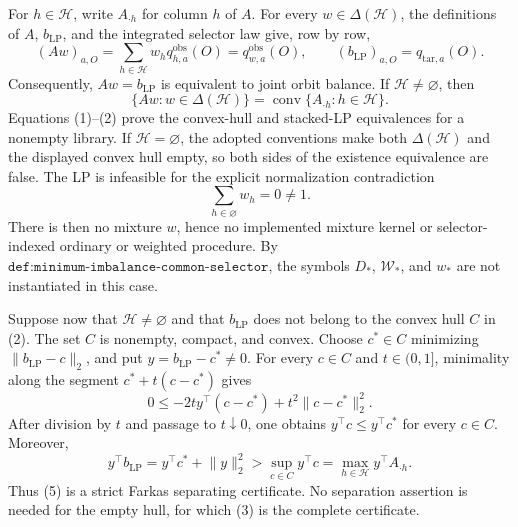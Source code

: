 For \(h\in\mathcal H\), write \(A_{\cdot h}\) for column \(h\) of \(A\). For every \(w\in\Delta(\mathcal H)\), the definitions of \(A\), \(b_{\mathrm{LP}}\), and the integrated selector law give, row by row,
\[
(Aw)_{a,O}=\sum_{h\in\mathcal H}w_hq^{\mathrm{obs}}_{h,a}(O)=q^{\mathrm{obs}}_{w,a}(O),
\qquad
(b_{\mathrm{LP}})_{a,O}=q_{\mathrm{tar},a}(O).
\tag{1}
\]
Consequently, \(Aw=b_{\mathrm{LP}}\) is equivalent to joint orbit balance. If \(\mathcal H\ne\varnothing\), then
\[
\{Aw:w\in\Delta(\mathcal H)\}=\operatorname{conv}\{A_{\cdot h}:h\in\mathcal H\}.
\tag{2}
\]
Equations (1)--(2) prove the convex-hull and stacked-LP equivalences for a nonempty library. If \(\mathcal H=\varnothing\), the adopted conventions make both \(\Delta(\mathcal H)\) and the displayed convex hull empty, so both sides of the existence equivalence are false. The LP is infeasible for the explicit normalization contradiction
\[
\sum_{h\in\varnothing}w_h=0\ne1.
\tag{3}
\]
There is then no mixture \(w\), hence no implemented mixture kernel or selector-indexed ordinary or weighted procedure. By \(\texttt{def:minimum-imbalance-common-selector}\), the symbols \(D_*\), \(\mathcal W_*\), and \(w_*\) are not instantiated in this case.

Suppose now that \(\mathcal H\ne\varnothing\) and that \(b_{\mathrm{LP}}\) does not belong to the convex hull \(C\) in (2). The set \(C\) is nonempty, compact, and convex. Choose \(c^*\in C\) minimizing \(\lVert b_{\mathrm{LP}}-c\rVert_2\), and put \(y=b_{\mathrm{LP}}-c^*\ne0\). For every \(c\in C\) and \(t\in(0,1]\), minimality along the segment \(c^*+t(c-c^*)\) gives
\[
0\le -2t y^\top(c-c^*)+t^2\lVert c-c^*\rVert_2^2.
\tag{4}
\]
After division by \(t\) and passage to \(t\downarrow0\), one obtains \(y^\top c\le y^\top c^*\) for every \(c\in C\). Moreover,
\[
y^\top b_{\mathrm{LP}}=y^\top c^*+\lVert y\rVert_2^2>\sup_{c\in C}y^\top c=\max_{h\in\mathcal H}y^\top A_{\cdot h}.
\tag{5}
\]
Thus (5) is a strict Farkas separating certificate. No separation assertion is needed for the empty hull, for which (3) is the complete certificate.

